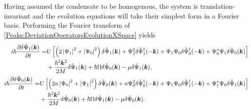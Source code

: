 Having assumed the condensate to be homogenous, the system is translation-invariant and the evolution equations will take their simplest form in a Fourier basis. Performing the Fourier transform of \eqref{Peaks:DeviationOperatorsEvolutionXSpace} yields
\begin{subequations}
    \label{Peaks:DeviationOperatorsEvolutionKSpace}
    \begin{align}
        \begin{split}
            i \hbar \frac{\partial \delta \hat{\Psi}_1(\bm{k})}{\partial t} =& U\left[ \left(2\abs{\Psi_1}^2+\abs{\Psi_0}^2 \right)\delta \hat{\Psi}_1(\bm{k}) + \Psi_1^2\delta\hat{\Psi}_1^\dagger(-\bm{k}) + \Psi_1\Psi_0\delta\hat{\Psi}_0^\dagger(-\bm{k}) + \Psi_0^*\Psi_1\delta\hat{\Psi}_0(\bm{k})\right]\\
                    & +\frac{\hbar^2 \bm{k}^2}{2M} \delta \hat{\Psi}_1(\bm{k}) +\hbar \Omega\delta\hat{\Psi}_0(\bm{k})- \mu \delta \hat{\Psi}_1(\bm{k}),
        \end{split}\\
        \begin{split}
        i \hbar \frac{\partial \delta \hat{\Psi}_0(\bm{k})}{\partial t} =& U\left[\left(2\kappa \abs{\Psi_0}^2 +\abs{\Psi_1}^2\right)\delta\hat{\Psi}_0(\bm{k}) + \kappa \Psi_0^2 \delta\hat{\Psi}_0^\dagger(-\bm{k}) + \Psi_1\Psi_0\delta\hat{\Psi}_1^\dagger(-\bm{k}) + \Psi_1^*\Psi_0\delta\hat{\Psi}_1(\bm{k})\right]\\
                    & +\frac{\hbar^2 \bm{k}^2}{2M} \delta \hat{\Psi}_0(\bm{k}) +\hbar \Omega\delta\hat{\Psi}_1(\bm{k}) - \mu \delta\hat{\Psi}_0(\bm{k}).
        \end{split}
    \end{align}
\end{subequations}

